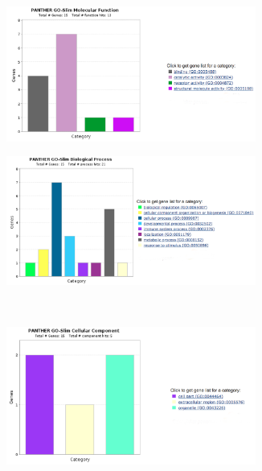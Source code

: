 \begin{figure}[H]
\label{adpdNOTadfigure}
\begin{subfigure}[b]{0.5\linewidth}
\centering
\includegraphics[width=0.9\textwidth]{./Figures/GO/adpdNOTad/adpdNOTad1}\par
\end{subfigure}
\begin{subfigure}[b]{0.5\linewidth}
\centering
\includegraphics[width=0.9\textwidth]{./Figures/GO/adpdNOTad/adpdNOTad2}\par
\end{subfigure}\\
\begin{subfigure}[b]{0.5\linewidth}
\centering
\includegraphics[width=0.9\textwidth]{./Figures/GO/adpdNOTad/adpdNOTad3}\par

\end{subfigure}
\end{figure}
